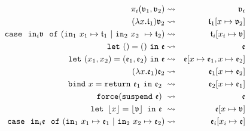 \begin{eqnarray*}
\pi_i(\v_1, \v_2) &\leadsto& \v_i\\
(\lambda x.\t_1)\v_2 &\leadsto& \t_1 [x \mapsto \v_2]\\
\mathtt{case}\ \ \mathtt{in}_i\v \ \ \mathtt{of}\ (\mathtt{in}_1\ x_1 \mapsto \t_1\  \lvert\  \mathtt{in}_2 \ x_2 \ \mapsto \t_2) &\leadsto& \t_i [x_i \mapsto \v]\\
\mathtt{let}\ ()=()\ \mathtt{in} \ \e &\leadsto& \e\\
\mathtt{let}\ (x_1,x_2)=(\e_1,\e_2)\ \mathtt{in}\ \e &\leadsto& \e[x \mapsto \e_1,x \mapsto \e_2]\\
(\lambda x.\e_1)\e_2 &\leadsto& \e_1[x \mapsto \e_2]\\
\mathtt{bind}\ x = \mathtt{return} \ \e_1\ \mathtt{in} \ \e_2\ &\leadsto&\ \e_2 [x \mapsto \e_1]\\
\mathtt{force}( \mathtt{suspend}\ \e)\ &\leadsto& \e\\
\mathtt{let}\  \floor{x}=\floor{\v}\  \mathtt{in}\ \e\ &\leadsto& \e[x\mapsto \v]\\
\mathtt{case}\ \ \mathtt{in}_i\e \ \ \mathtt{of}\ (\mathtt{in}_1\ x_1 \mapsto \e_1\  \lvert\  \mathtt{in}_2 \ x_2 \mapsto \e_2) &\leadsto& \e_i [x_i \mapsto \e]
\end{eqnarray*}
